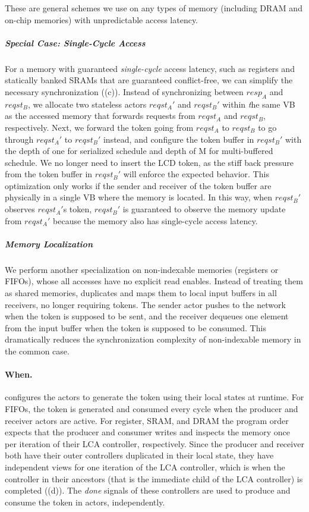 These are general schemes we use on any types of memory (including DRAM and on-chip memories) with unpredictable access latency.

\subparagraph{Special Case: Single-Cycle Access}
For a memory with guaranteed {\em single-cycle} access latency, such as registers and statically banked SRAMs that are guaranteed conflict-free, we can simplify the necessary synchronization ((c)).
Instead of synchronizing between $resp_A$ and $reqst_B$, we allocate two stateless actors $reqst_A'$ and $reqst_B'$ within {\emph the same} VB as the accessed memory that forwards requests from $reqst_A$ and $reqst_B$, respectively.
Next, we forward the token going from $reqst_A$ to $reqst_B$ to go through $reqst_A'$ to $reqst_B'$ instead, and configure the token buffer in $reqst_B'$ with the depth of one for serialized schedule and depth of M for multi-buffered schedule. 
We no longer need to insert the LCD token, as the stiff back pressure from the token buffer in $reqst_B'$ will enforce the expected behavior.
This optimization only works if the sender and receiver of the token buffer are physically in a single VB where the memory is located.
In this way, when $reqst_B'$ observes $reqst_A'$s token, $reqst_B'$ is guaranteed to observe the memory update from $reqst_A'$ because the memory also has single-cycle access latency.

\subparagraph{Memory Localization}
We perform another specialization on non-indexable memories (registers or FIFOs), whose all accesses have no explicit read enables.
Instead of treating them as shared memories, \name{} duplicates and maps them to local input buffers in all receivers, no longer requiring tokens.
The sender actor pushes to the network when the token is supposed to be sent, and the receiver dequeues one element from the input buffer when the token is supposed to be consumed.
This dramatically reduces the synchronization complexity of non-indexable memory in the common case.

\paragraph{When.}
\name{} configures the actors to generate the token using their local states at runtime.
For FIFOs, the token is generated and consumed every cycle when the producer and receiver actors are active.
For register, SRAM, and DRAM the program order expects that the producer and consumer writes and inspects the memory once per iteration of their LCA controller, respectively.
Since the producer and receiver both have their outer controllers duplicated in their local state, they have independent views for one iteration of the LCA controller, which is when the controller in their ancestors (that is the immediate child of the LCA controller) is completed ((d)).
The {\em done} signals of these controllers are used to produce and consume the token in actors, independently.

